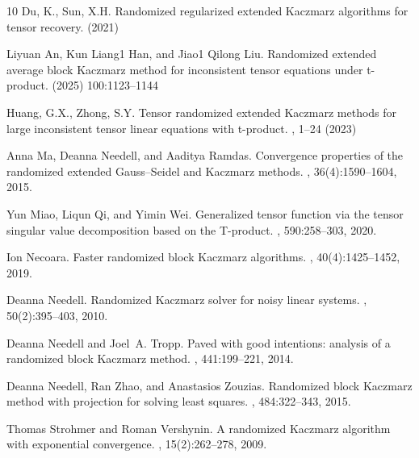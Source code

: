 \documentclass[11pt]{article}
\begin{document}
{\begin{thebibliography}{10}
Du, K., Sun, X.H.
\newblock Randomized regularized extended Kaczmarz algorithms for tensor recovery. 
(2021)

Liyuan An, Kun Liang1 Han, and Jiao1 Qilong Liu.
\newblock Randomized extended average block Kaczmarz method
for inconsistent tensor equations under t-product.
 (2025) 100:1123–1144

 Huang, G.X., Zhong, S.Y.
\newblock Tensor randomized extended Kaczmarz methods for large inconsistent
tensor linear equations with t-product. 
, 1–24 (2023)





Anna Ma, Deanna Needell, and Aaditya Ramdas.
\newblock Convergence properties of the randomized extended {G}auss--{S}eidel
  and {K}aczmarz methods.
, 36(4):1590--1604, 2015.

Yun Miao, Liqun Qi, and Yimin Wei.
\newblock Generalized tensor function via the tensor singular value
  decomposition based on the {T}-product.
, 590:258--303, 2020.




Ion Necoara.
\newblock Faster randomized block {K}aczmarz algorithms.
, 40(4):1425--1452, 2019.

Deanna Needell.
\newblock Randomized {K}aczmarz solver for noisy linear systems.
, 50(2):395--403, 2010.

Deanna Needell and Joel~A. Tropp.
\newblock Paved with good intentions: analysis of a randomized block {K}aczmarz
  method.
, 441:199--221, 2014.

Deanna Needell, Ran Zhao, and Anastasios Zouzias.
\newblock Randomized block {K}aczmarz method with projection for solving least
  squares.
, 484:322--343, 2015.


Thomas Strohmer and Roman Vershynin.
\newblock A randomized {K}aczmarz algorithm with exponential convergence.
, 15(2):262--278, 2009.


\end{thebibliography}}
\end{document}
